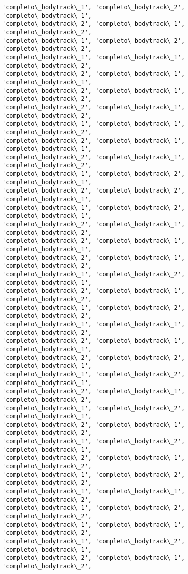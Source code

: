\documentclass[11pt]{article}
\begin{document}
\begin{Verbatim}[commandchars=\\\{\}]
'completo\_bodytrack\_1', 'completo\_bodytrack\_2', 'completo\_bodytrack\_1',
'completo\_bodytrack\_2', 'completo\_bodytrack\_1', 'completo\_bodytrack\_2',
'completo\_bodytrack\_1', 'completo\_bodytrack\_2', 'completo\_bodytrack\_2',
'completo\_bodytrack\_1', 'completo\_bodytrack\_1', 'completo\_bodytrack\_2',
'completo\_bodytrack\_2', 'completo\_bodytrack\_1', 'completo\_bodytrack\_1',
'completo\_bodytrack\_2', 'completo\_bodytrack\_1', 'completo\_bodytrack\_2',
'completo\_bodytrack\_2', 'completo\_bodytrack\_1', 'completo\_bodytrack\_2',
'completo\_bodytrack\_1', 'completo\_bodytrack\_1', 'completo\_bodytrack\_2',
'completo\_bodytrack\_2', 'completo\_bodytrack\_1', 'completo\_bodytrack\_1',
'completo\_bodytrack\_2', 'completo\_bodytrack\_1', 'completo\_bodytrack\_2',
'completo\_bodytrack\_1', 'completo\_bodytrack\_2', 'completo\_bodytrack\_1',
'completo\_bodytrack\_2', 'completo\_bodytrack\_2', 'completo\_bodytrack\_1',
'completo\_bodytrack\_1', 'completo\_bodytrack\_2', 'completo\_bodytrack\_1',
'completo\_bodytrack\_2', 'completo\_bodytrack\_1', 'completo\_bodytrack\_2',
'completo\_bodytrack\_2', 'completo\_bodytrack\_1', 'completo\_bodytrack\_1',
'completo\_bodytrack\_2', 'completo\_bodytrack\_1', 'completo\_bodytrack\_2',
'completo\_bodytrack\_1', 'completo\_bodytrack\_2', 'completo\_bodytrack\_1',
'completo\_bodytrack\_2', 'completo\_bodytrack\_1', 'completo\_bodytrack\_2',
'completo\_bodytrack\_1', 'completo\_bodytrack\_2', 'completo\_bodytrack\_2',
'completo\_bodytrack\_1', 'completo\_bodytrack\_1', 'completo\_bodytrack\_2',
'completo\_bodytrack\_2', 'completo\_bodytrack\_1', 'completo\_bodytrack\_1',
'completo\_bodytrack\_2', 'completo\_bodytrack\_2', 'completo\_bodytrack\_1',
'completo\_bodytrack\_1', 'completo\_bodytrack\_2', 'completo\_bodytrack\_1',
'completo\_bodytrack\_2', 'completo\_bodytrack\_1', 'completo\_bodytrack\_2',
'completo\_bodytrack\_1', 'completo\_bodytrack\_2', 'completo\_bodytrack\_1',
'completo\_bodytrack\_2', 'completo\_bodytrack\_1', 'completo\_bodytrack\_2',
'completo\_bodytrack\_1', 'completo\_bodytrack\_2', 'completo\_bodytrack\_1',
'completo\_bodytrack\_2', 'completo\_bodytrack\_1', 'completo\_bodytrack\_2',
'completo\_bodytrack\_1', 'completo\_bodytrack\_2', 'completo\_bodytrack\_2',
'completo\_bodytrack\_1', 'completo\_bodytrack\_1', 'completo\_bodytrack\_2',
'completo\_bodytrack\_1', 'completo\_bodytrack\_2', 'completo\_bodytrack\_2',
'completo\_bodytrack\_1', 'completo\_bodytrack\_1', 'completo\_bodytrack\_2',
'completo\_bodytrack\_1', 'completo\_bodytrack\_2', 'completo\_bodytrack\_1',
'completo\_bodytrack\_2', 'completo\_bodytrack\_1', 'completo\_bodytrack\_2',

\end{Verbatim}
\end{document}
